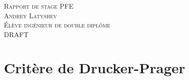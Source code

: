 \documentclass[12pt]{article}
\begin{document}
\begin{titlepage}
	\newcommand{\HRule}{\rule{\linewidth}{0.5mm}}
	\center
    
	\textsc{\large Rapport de stage PFE}\\[0.5cm]
    \textsc{\large Andrey Latyshev}\\[0.5cm]    
    \textsc{Élève ingénieur de double diplôme}\\[1.5cm]



	\textsc{\huge DRAFT}

\end{titlepage}

\pagestyle{plain}

\section{Critère de Drucker-Prager}
\end{document}
